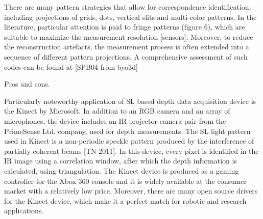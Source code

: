 	There are many pattern strategies that allow for correspondence identification, including projections of grids, dots, vertical slits and multi-color patterns. In the literature, particular attention is paid to fringe patterns (figure 6), which are suitable to maximize the measurement resolution [sensors]. Moreover, to reduce the reconstruction artefacts, the measurement process is often extended into a sequence of different pattern projections. A comprehensive assessment of such codes can be found at [SPB04 from byo3d]
	
	Pros and cons.
	
	Particularly noteworthy application of SL based depth data acquisition device is the Kinect by Microsoft. In addition to an RGB camera and an array of microphones, the device includes an IR projector-camera pair from the PrimeSense Ltd. company, used for depth measurements. The SL light pattern used in Kinect is a non-periodic speckle pattern produced by the interference of partially coherent beams [TN-2011]. In this device, every pixel is identified in the IR image using a correlation window, after which the depth information is calculated, using triangulation. The Kinect device is produced as a gaming controller for the Xbox 360 console and it is widely available at the consumer market with a relatively low price. Moreover, there are many open source drivers for the Kinect device, which make it a perfect match for robotic and research applications.
	
